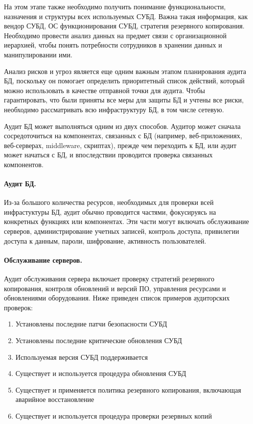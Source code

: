 На этом этапе также необходимо получить понимание функциональности, назначения и структуры всех используемых СУБД. Важна такая информация, как вендор СУБД, ОС функционирования СУБД, стратегия резервного копирования. Необходимо провести анализ данных на предмет связи с организационной иерархией, чтобы понять потребности сотрудников в хранении данных и манипулировании ими.

Анализ рисков и угроз является еще одним важным этапом планирования аудита БД, поскольку он помогает определить приоритетный список действий, который можно использовать в качестве отправной точки для аудита. Чтобы гарантировать, что были приняты все меры для защиты БД и учтены все риски, необходимо рассматривать всю инфраструктуру БД, в том числе сетевую.

Аудит БД может выполняться одним из двух способов. Аудитор может сначала сосредоточиться на компонентах, связанных с БД (например, веб-приложениях, веб-серверах, middleware, скриптах), прежде чем переходить к БД, или аудит может начаться с БД, и впоследствии проводится проверка связанных компонентов.

\paragraph{Аудит БД.}

Из-за большого количества ресурсов, необходимых для проверки всей инфрастуктуры БД, аудит обычно проводится частями, фокусируясь на конкретных функциях или компонентах. Эти части могут включать обслуживание серверов, администрирование учетных записей, контроль доступа, привилегии доступа к данным, пароли, шифрование, активность пользователей.

\paragraph{Обслуживание серверов.}

Аудит обслуживания сервера включает проверку стратегий резервного копирования, контроля обновлений и версий ПО, управления ресурсами и обновлениями оборудования. Ниже приведен список примеров аудиторских проверок:

\begin{enumerate}
	\item Установлены последние патчи безопасности СУБД
	\item Установлены последние критические обновления СУБД
	\item Используемая версия СУБД поддерживается
	\item Существует и используется процедура обновления СУБД
	\item Существует и применяется политика резервного копирования, включающая аварийное восстановление
	\item Существует и используется процедура проверки резервных копий
\end{enumerate}

